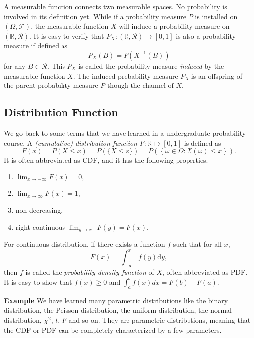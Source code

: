 \documentclass[11pt]{article}
\providecommand{\tightlist}{%
      \setlength{\itemsep}{0pt}\setlength{\parskip}{0pt}}
\begin{document}
A measurable function connects two measurable spaces. No probability is
involved in its definition yet. While if a probability measure \(P\) is
installed on \((\Omega, \mathcal{F})\), the measurable function \(X\)
will induce a probability measure on \((\mathbb{R},\mathcal{R})\). It is
easy to verify that
\(P_{X}:(\mathbb{R},\mathcal{R})\mapsto\left[0,1\right]\) is also a
probability measure if defined as
\[P_{X}\left(B\right)=P\left(X^{-1}\left(B\right)\right)\] for any
\(B\in\mathcal{R}\). This \(P_{X}\) is called the probability measure
\emph{induced} by the measurable function \(X\). The induced probability
measure \(P_X\) is an offspring of the parent probability measure \(P\)
though the channel of \(X\).

    \subsection{Distribution Function}\label{distribution-function}

We go back to some terms that we have learned in a undergraduate
probability course. A \emph{(cumulative) distribution function}
\(F:\mathbb{R}\mapsto [0,1]\) is defined as
\[F\left(x\right)=P\left(X\leq x\right)=
P\left(\{X\leq x\}\right)=P\left(\left\{ \omega\in\Omega:X\left(\omega\right)\leq x\right\} \right).\]
It is often abbreviated as CDF, and it has the following properties.

\begin{enumerate}
\def\labelenumi{(\roman{enumi})}
\tightlist
\item
  \(\lim_{x\to-\infty}F\left(x\right)=0\),
\item
  \(\lim_{x\to\infty}F\left(x\right)=1\),
\item
  non-decreasing,
\item
  right-continuous \(\lim_{y\to x^{+}}F\left(y\right)=F\left(x\right).\)
\end{enumerate}

For continuous distribution, if there exists a function \(f\) such that
for all \(x\),
\[F\left(x\right)=\int_{-\infty}^{x}f\left(y\right)\mathrm{d}y,\] then
\(f\) is called the \emph{probability density function} of \(X\), often
abbreviated as PDF. It is easy to show that \(f\left(x\right)\geq0\) and
\(\int_{a}^{b}f\left(x\right)dx=F\left(b\right)-F\left(a\right)\).

\textbf{Example} We have learned many parametric distributions like the
binary distribution, the Poisson distribution, the uniform distribution,
the normal distribution, \(\chi^{2}\), \(t\), \(F\) and so on. They are
parametric distributions, meaning that the CDF or PDF can be completely
characterized by a few parameters.
\end{document}
